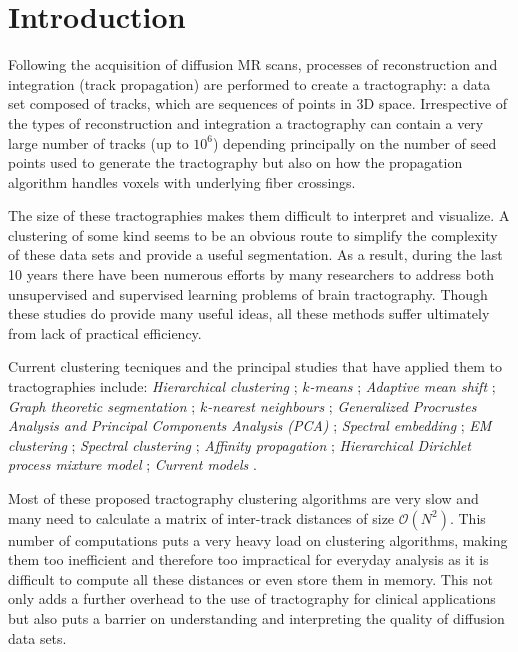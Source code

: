 \documentclass[preprint,authoryear,a4paper,10pt,onecolumn]{elsarticle}
\begin{document}
\section{Introduction}

Following the acquisition of diffusion MR scans, processes of
reconstruction and integration (track propagation) are performed to
create a tractography: a data set composed of tracks, which are
sequences of points in 3D space. Irrespective of the types of
reconstruction and integration a tractography can contain a very large
number of tracks (up to $10^6$) depending principally on the number of
seed points used to generate the tractography but also on how the
propagation algorithm handles voxels with underlying fiber crossings.

The size of these tractographies makes them difficult to interpret and
visualize. A clustering of some kind seems to be an obvious route to
simplify the complexity of these data sets and provide a useful
segmentation.  As a result, during the last 10 years there have been
numerous efforts by many researchers to address both unsupervised and
supervised learning problems of brain tractography. Though these studies
do provide many useful ideas, all these methods suffer ultimately from
lack of practical efficiency.

Current clustering tecniques and the principal studies that have applied them to tractographies include:
\textit{Hierarchical clustering} \citep{Visser2010,
  gerig2004analysis, Guevara2010, zhang2005dti, jianu2009exploring};
\textit{$k$-means} \citep{ElKouby2005, Tsai2007}; \textit{Adaptive mean
  shift} \citep{zvitia2008adaptive, Zvitia2010}; \textit{Graph theoretic
  segmentation} \citep{brun2004clustering}; \textit{$k$-nearest
  neighbours} \citep{Ding2003a}; \textit{Generalized Procrustes Analysis
  and Principal Components Analysis (PCA)} \citep{Corouge2004,
  corouge2004towards, Corouge2006}; \textit{Spectral embedding}
\citep{ODonnell_IEEETMI07}; \textit{EM clustering}
\citep{Maddah_MICCA2005, maddah2006statistical, Maddah_IEEEBI2008,
  ziyan2009consistency}; \textit{Spectral clustering}
\citep{jonasson2005fiber}; \textit{Affinity propagation}
\citep{leemans17new, malcolm2009filtered}; \textit{Hierarchical
  Dirichlet process mixture model} \citep{wang2010tractography};
\textit{Current models} \citep{Durrleman2009,
  durrleman2010registration}.

Most of these proposed tractography clustering algorithms are very slow
and many need to calculate a matrix of inter-track distances of size
$\mathcal{O}(N^2)$. This number of computations puts a very heavy load
on clustering algorithms, making them too inefficient and therefore too
impractical for everyday analysis as it is difficult to compute all
these distances or even store them in memory. This not only adds a
further overhead to the use of tractography for clinical applications
but also puts a barrier on understanding and interpreting the quality of
diffusion data sets.
\end{document}
